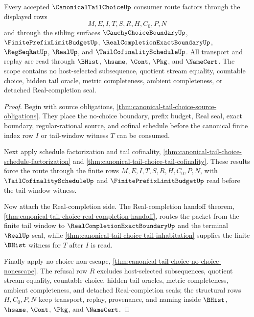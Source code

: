 \begin{theorem}
\label{thm:canonical-tail-choice-scope-grounding}
Every accepted $\CanonicalTailChoiceUp$ consumer route factors through the displayed rows
$$
M,E,I,T,S,R,H,C_0,P,N
$$
and through the sibling surfaces $\CauchyChoiceBoundaryUp$, $\FinitePrefixLimitBudgetUp$, $\RealCompletionExactBoundaryUp$, $\RegSeqRatUp$, $\RealUp$, and $\TailCofinalityScheduleUp$. All transport and replay are read through $\BHist$, $\hsame$, $\Cont$, $\Pkg$, and $\NameCert$. The scope contains no host-selected subsequence, quotient stream equality, countable choice, hidden tail oracle, metric completeness, ambient completeness, or detached Real-completion seal.
\end{theorem}
\begin{proof}
Begin with source obligations, \autoref{thm:canonical-tail-choice-source-obligations}. They place the no-choice boundary, prefix budget, Real seal, exact boundary, regular-rational source, and cofinal schedule before the canonical finite index row $I$ or tail-window witness $T$ can be consumed.

Next apply schedule factorization and tail cofinality, \autoref{thm:canonical-tail-choice-schedule-factorization} and \autoref{thm:canonical-tail-choice-tail-cofinality}. These results force the route through the finite rows $M,E,I,T,S,R,H,C_0,P,N$, with $\TailCofinalityScheduleUp$ and $\FinitePrefixLimitBudgetUp$ read before the tail-window witness.

Now attach the Real-completion side. The Real-completion handoff theorem, \autoref{thm:canonical-tail-choice-real-completion-handoff}, routes the packet from the finite tail window to $\RealCompletionExactBoundaryUp$ and the terminal $\RealUp$ seal, while \autoref{thm:canonical-tail-choice-tail-inhabitation} supplies the finite $\BHist$ witness for $T$ after $I$ is read.

Finally apply no-choice non-escape, \autoref{thm:canonical-tail-choice-no-choice-nonescape}. The refusal row $R$ excludes host-selected subsequences, quotient stream equality, countable choice, hidden tail oracles, metric completeness, ambient completeness, and detached Real-completion seals; the structural rows $H,C_0,P,N$ keep transport, replay, provenance, and naming inside $\BHist$, $\hsame$, $\Cont$, $\Pkg$, and $\NameCert$.
\end{proof}

